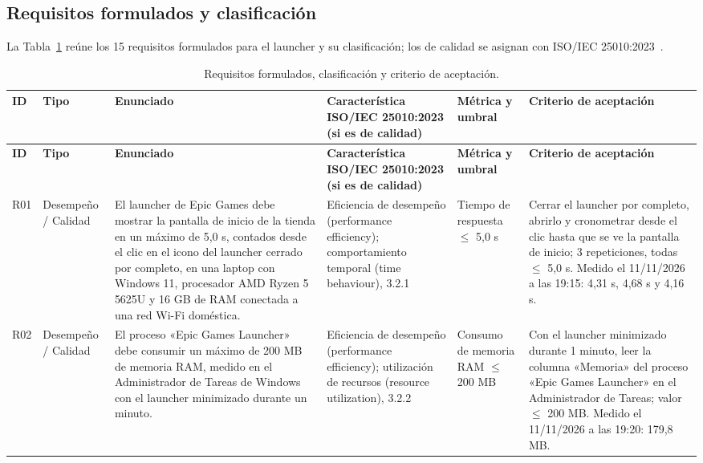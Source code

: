 \documentclass[10pt,a4paper]{article}
\begin{document}
\begin{landscape}
\section{Requisitos formulados y clasificaci\'on}
La Tabla~\ref{tab:requisitos} reúne los 15 requisitos formulados para el launcher y su clasificación; los de calidad se asignan con ISO/IEC 25010:2023~\cite{iso25010}.

\begingroup\scriptsize\setlength{\tabcolsep}{2.5pt}\renewcommand{\arraystretch}{1.05}
\begin{longtable}{|>{\raggedright\arraybackslash}p{1cm}|>{\raggedright\arraybackslash}p{2.1cm}|>{\raggedright\arraybackslash}p{6.6cm}|>{\raggedright\arraybackslash}p{3.4cm}|>{\raggedright\arraybackslash}p{2.6cm}|>{\raggedright\arraybackslash}p{9.2cm}|}
\caption{Requisitos formulados, clasificación y criterio de aceptación.}\label{tab:requisitos}\\
\hline\rowcolor{hdr}\textbf{ID} & \textbf{Tipo} & \textbf{Enunciado} & \textbf{Característica ISO/IEC 25010:2023 (si es de calidad)} & \textbf{Métrica y umbral} & \textbf{Criterio de aceptación} \\ \hline
\endfirsthead
\hline\rowcolor{hdr}\textbf{ID} & \textbf{Tipo} & \textbf{Enunciado} & \textbf{Característica ISO/IEC 25010:2023 (si es de calidad)} & \textbf{Métrica y umbral} & \textbf{Criterio de aceptación} \\ \hline
\endhead
R01 & Desempeño / Calidad & El launcher de Epic Games debe mostrar la pantalla de inicio de la tienda en un máximo de 5,0 s, contados desde el clic en el icono del launcher cerrado por completo, en una laptop con Windows 11, procesador AMD Ryzen 5 5625U y 16 GB de RAM conectada a una red Wi-Fi doméstica. & Eficiencia de desempeño (performance efficiency); comportamiento temporal (time behaviour), 3.2.1 & Tiempo de respuesta $\leq$ 5,0 s & Cerrar el launcher por completo, abrirlo y cronometrar desde el clic hasta que se ve la pantalla de inicio; 3 repeticiones, todas $\leq$ 5,0 s. Medido el 11/11/2026 a las 19:15: 4,31 s, 4,68 s y 4,16 s. \\ \hline
R02 & Desempeño / Calidad & El proceso «Epic Games Launcher» debe consumir un máximo de 200 MB de memoria RAM, medido en el Administrador de Tareas de Windows con el launcher minimizado durante un minuto. & Eficiencia de desempeño (performance efficiency); utilización de recursos (resource utilization), 3.2.2 & Consumo de memoria RAM $\leq$ 200 MB & Con el launcher minimizado durante 1 minuto, leer la columna «Memoria» del proceso «Epic Games Launcher» en el Administrador de Tareas; valor $\leq$ 200 MB. Medido el 11/11/2026 a las 19:20: 179,8 MB. \\ \hline

\end{longtable}
\end{landscape}
\end{document}
